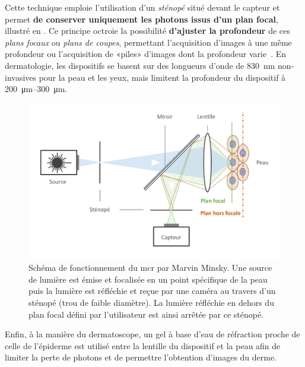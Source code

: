 \addtocounter{footnote}{1}

Cette technique emploie l’utilisation d’un \textit{sténopé} situé devant le capteur et permet \textbf{de conserver uniquement les photons issus d'un plan focal}, illustré en . Ce principe octroie la possibilité \textbf{d'ajuster la profondeur} de ces \textit{plans focaux} ou \textit{plans de coupes}, permettant l'acquisition d'images à une même profondeur ou l'acquisition de «piles» d'images dont la profondeur varie~\cite{Sheppard2015}. En dermatologie, les dispositifs se basent sur des longueurs d’onde de \SI{830}{\nano\metre} non-invasives pour la peau et les yeux, mais limitent la profondeur du dispositif à \SIrange{200}{300}{\micro\metre}.\par

\begin{figure}[H]
\centering
    \includegraphics[width=\linewidth]{contents/chapter_2/resources/scheme_principle_rcm.pdf}
    \caption{Schéma de fonctionnement du \gls{mcr} par Marvin Minsky. Une source de lumière est émise et focalisée en un point spécifique de la peau puis la lumière est réfléchie et reçue par une caméra au travers d'un sténopé (trou de faible diamètre). La lumière réfléchie en dehors du plan focal défini par l'utilisateur est ainsi arrêtée par ce sténopé.}
    \label{fig:scheme_principle_rcm}
\end{figure}\par

Enfin, à la manière du dermatoscope, un gel à base d’eau de réfraction proche de celle de l’épiderme est utilisé entre la lentille du dispositif et la peau afin de limiter la perte de photons et de permettre l’obtention d’images du derme.\par

